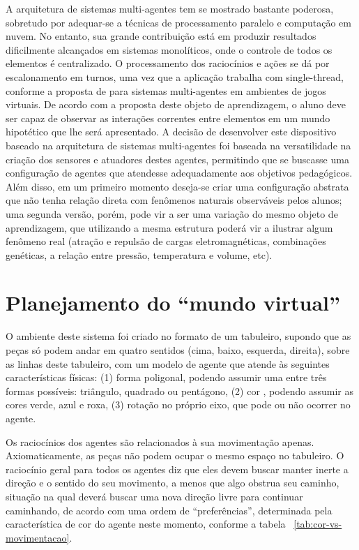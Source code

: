 \documentclass[a0,portrait]{a0poster}
\begin{document}
A arquitetura de sistemas multi-agentes tem se mostrado bastante poderosa,
sobretudo por adequar-se a técnicas de processamento paralelo e computação em nuvem.
No entanto, sua grande contribuição está em produzir resultados dificilmente
alcançados em sistemas monolíticos, onde o controle de todos os elementos é
centralizado. O processamento dos raciocínios e ações se dá por escalonamento em
turnos, uma vez que a aplicação trabalha com single-thread, conforme a proposta de
\cite{behrens-2010} para sistemas multi-agentes em ambientes de jogos virtuais.
De acordo com a proposta deste objeto de aprendizagem, o aluno deve ser capaz
de observar as interações correntes entre elementos em um mundo hipotético que lhe
será apresentado. A decisão de desenvolver este dispositivo baseado na arquitetura de
sistemas multi-agentes foi baseada na versatilidade na criação dos sensores e atuadores
destes agentes, permitindo que se buscasse uma configuração de agentes que atendesse
adequadamente aos objetivos pedagógicos. Além disso, em um primeiro momento
deseja-se criar uma configuração abstrata que não tenha relação direta com fenômenos
naturais observáveis pelos alunos; uma segunda versão, porém, pode vir a ser uma
variação do mesmo objeto de aprendizagem, que utilizando a mesma estrutura poderá
vir a ilustrar algum fenômeno real (atração e repulsão de cargas eletromagnéticas,
combinações genéticas, a relação entre pressão, temperatura e volume, etc).

\section{Planejamento do ``mundo virtual''}

O ambiente deste sistema foi criado no formato de um tabuleiro, supondo que as peças
só podem andar em quatro sentidos (cima, baixo, esquerda, direita), sobre as linhas
deste tabuleiro, com um modelo de agente que atende às seguintes características
físicas: (1) forma poligonal, podendo assumir uma entre três formas possíveis:
triângulo, quadrado ou pentágono, (2) cor , podendo assumir as cores verde, azul e roxa,
(3) rotação no próprio eixo, que pode ou não ocorrer no agente.

Os raciocínios dos agentes são relacionados à sua movimentação apenas.
Axiomaticamente, as peças não podem ocupar o mesmo espaço no tabuleiro. O
raciocínio geral para todos os agentes diz que eles devem buscar manter inerte a direção
e o sentido do seu movimento, a menos que algo obstrua seu caminho, situação na qual
deverá buscar uma nova direção livre para continuar caminhando, de acordo com uma
ordem de “preferências”, determinada pela característica de cor do agente neste
momento, conforme a tabela ~\ref{tab:cor-vs-movimentacao}.
\end{document}
